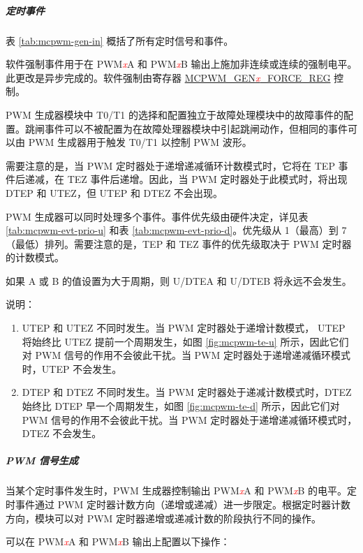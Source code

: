 \documentclass[main\_\_CN.tex]{subfiles}
\begin{document}
\subparagraph{定时事件}
表 \ref{tab:mcpwm-gen-in} 概括了所有定时信号和事件。



软件强制事件用于在 PWM\textcolor{red}{\it{x}}A 和 PWM\textcolor{red}{\it{x}}B 输出上施加非连续或连续的强制电平。此更改是异步完成的。软件强制由寄存器 \hyperref[regdesc:MCPWMGEN0FORCEREG]{MCPWM\_GEN\textcolor{red}{\it{x}}\_FORCE\_REG} 控制。

PWM 生成器模块中 T0/T1 的选择和配置独立于故障处理模块中的故障事件的配置。跳闸事件可以不被配置为在故障处理器模块中引起跳闸动作，但相同的事件可以由 PWM 生成器用于触发 T0/T1 以控制 PWM 波形。

需要注意的是，当 PWM 定时器处于递增递减循环计数模式时，它将在 TEP 事件后递减，在 TEZ 事件后递增。因此，当 PWM 定时器处于此模式时，将出现 DTEP 和 UTEZ，但 UTEP 和 DTEZ 不会出现。

PWM 生成器可以同时处理多个事件。事件优先级由硬件决定，详见表 \ref{tab:mcpwm-evt-prio-u} 和表 \ref{tab:mcpwm-evt-prio-d}。优先级从 1（最高）到 7（最低）排列。需要注意的是，TEP 和 TEZ 事件的优先级取决于 PWM 定时器的计数模式。

如果 A 或 B 的值设置为大于周期，则 U/DTEA 和 U/DTEB 将永远不会发生。




说明：
\begin{enumerate}
    \item UTEP 和 UTEZ 不同时发生。当 PWM 定时器处于递增计数模式， UTEP 将始终比 UTEZ 提前一个周期发生，如图 \ref{fig:mcpwm-te-u} 所示，因此它们对 PWM 信号的作用不会彼此干扰。当 PWM 定时器处于递增递减循环模式时，UTEP 不会发生。
    \item DTEP 和 DTEZ 不同时发生。当 PWM 定时器处于递减计数模式时，DTEZ 始终比 DTEP 早一个周期发生，如图 \ref{fig:mcpwm-te-d} 所示，因此它们对 PWM 信号的作用不会彼此干扰。当 PWM 定时器处于递增递减循环模式时，DTEZ 不会发生。
\end{enumerate}

\subparagraph{PWM 信号生成}
当某个定时事件发生时，PWM 生成器控制输出 PWM\textcolor{red}{\it{x}}A 和 PWM\textcolor{red}{\it{x}}B 的电平。定时事件通过 PWM 定时器计数方向（递增或递减）进一步限定。根据定时器计数方向，模块可以对 PWM 定时器递增或递减计数的阶段执行不同的操作。

可以在 PWM\textcolor{red}{\it{x}}A 和 PWM\textcolor{red}{\it{x}}B 输出上配置以下操作：
\end{document}

